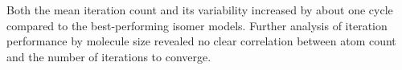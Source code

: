 Both the mean iteration count and its variability increased by about one cycle compared to the best-performing isomer models. Further analysis of iteration performance by molecule size revealed no clear correlation between atom count and the number of iterations to converge.
